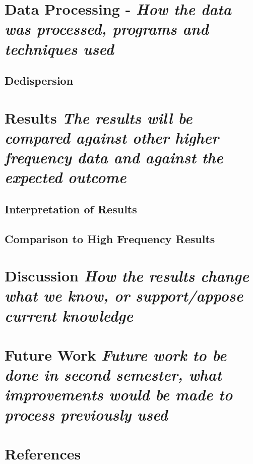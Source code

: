 \documentclass[draft]{article}
\newcommand{\edit}[1]{\color{red}\textsl{#1}}
\begin{document}
\section{Data Processing - \edit{How the data was processed, programs and techniques used}}
\subsection{Dedispersion}


\section{Results \edit{The results will be compared against other higher frequency data and against the expected outcome}}
\subsection{Interpretation of Results}
\subsection{Comparison to High Frequency Results}

\section{Discussion \edit{How the results change what we know, or support/appose current knowledge}}

\section{Future Work \edit{Future work to be done in second semester, what improvements would be made to process previously used}}

\section{References}
\end{document}
